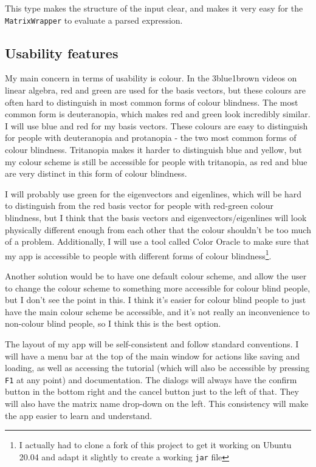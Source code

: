 \documentclass[../main.tex]{subfiles}
\begin{document}
This type makes the structure of the input clear, and makes it very easy for the \texttt{MatrixWrapper} to evaluate a parsed expression.

\subsection{Usability features\label{design:usability-features}}

My main concern in terms of usability is colour. In the 3blue1brown videos on linear algebra, red and green are used for the basis vectors, but these colours are often hard to distinguish in most common forms of colour blindness. The most common form is deuteranopia\cite{types-of-color-blindness}, which makes red and green look incredibly similar. I will use blue and red for my basis vectors. These colours are easy to distinguish for people with deuteranopia and protanopia - the two most common forms of colour blindness. Tritanopia makes it harder to distinguish blue and yellow, but my colour scheme is still be accessible for people with tritanopia, as red and blue are very distinct in this form of colour blindness.

I will probably use green for the eigenvectors and eigenlines, which will be hard to distinguish from the red basis vector for people with red-green colour blindness, but I think that the basis vectors and eigenvectors/eigenlines will look physically different enough from each other that the colour shouldn't be too much of a problem. Additionally, I will use a tool called Color Oracle\cite{colororacle.org} to make sure that my app is accessible to people with different forms of colour blindness\footnote{I actually had to clone a fork of this project\cite{color-oracle-dorkbox-fork} to get it working on Ubuntu 20.04 and adapt it slightly to create a working \texttt{jar} file}.

Another solution would be to have one default colour scheme, and allow the user to change the colour scheme to something more accessible for colour blind people, but I don't see the point in this. I think it's easier for colour blind people to just have the main colour scheme be accessible, and it's not really an inconvenience to non-colour blind people, so I think this is the best option.

The layout of my app will be self-consistent and follow standard conventions. I will have a menu bar at the top of the main window for actions like saving and loading, as well as accessing the tutorial (which will also be accessible by pressing \texttt{F1} at any point) and documentation. The dialogs will always have the confirm button in the bottom right and the cancel button just to the left of that. They will also have the matrix name drop-down on the left. This consistency will make the app easier to learn and understand.
\end{document}
